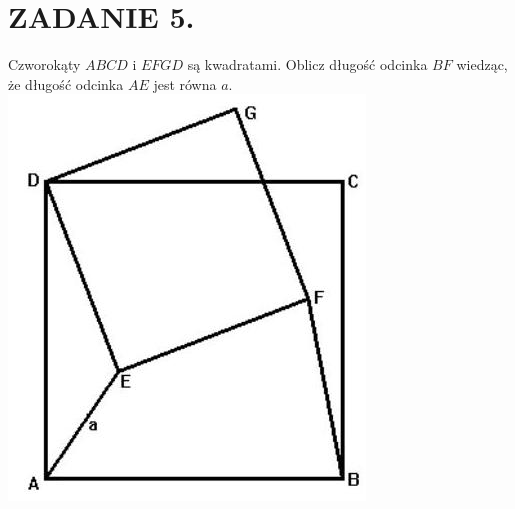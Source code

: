 \documentclass[10pt]{article}
\begin{document}
\section*{ZADANIE 5.}
Czworokąty \(A B C D\) i \(E F G D\) są kwadratami. Oblicz długość odcinka \(B F\) wiedząc, że długość odcinka \(A E\) jest równa \(a\).\\
\includegraphics[max width=\textwidth, center]{2024_11_21_c97ae173c926e782bf17g-1}
\end{document}

